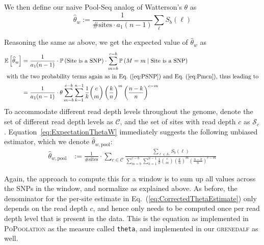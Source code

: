 \documentclass[letterpaper,fontsize=9pt,DIV=12]{scrartcl}
\newcommand\toolname{\textsc}
\newcommand\eqnref[1]{Eq.~(\ref{#1})}
\newcommand{\samplesize}{n}
\newcommand{\readdepth}{c}
\begin{document}
We then define our naive Pool-Seq analog of Watterson's $\theta$ as
\[
\widehat{\theta}_w :=\frac{1}{\text{\# sites} \cdot a_1(\samplesize-1)}\sum_{\ell} S_b(\ell)
\]

Reasoning the same as above, we get the expected value of $\widehat{\theta}_w$ as
%
\begin{align}
    \nonumber
    \mathbb{E}\left[\widehat{\theta}_w\right]
    &= \frac{1}{a_1(\samplesize-1)} \cdot \mathbb{P}\left(\text{Site is a SNP}\right)
        \cdot \sum_{m=b}^{\readdepth-b} \mathbb{P}\left(M = m \mid \text{Site is a SNP}\right)
    \\
    \intertext{
        with the two probability terms again as in \eqnref{eq:PSNP} and \eqnref{eq:Pmcn}, thus leading to
    }
    \label{eq:ExpectationThetaW}
    &= \frac{1}{a_1(n-1)} \cdot \theta\sum_{m=b}^{\readdepth-b}\sum_{k=1}^{n-1} \frac{1}{k} \binom{\readdepth}{m} \left(\frac{k}{\samplesize}\right)^m \left(\frac{\samplesize-k}{\samplesize}\right)^{\readdepth-m}
\end{align}
%
To accommodate different read depth levels throughout the genome, denote the set of different read depth levels as $\mathcal{C}$, and the set of sites with read depth $c$ as $\mathcal{S}_c$. Equation~\ref{eq:ExpectationThetaW} immediately suggests the following unbiased estimator, which we denote $\widehat{\theta}_{w, \text{pool}}$:
%
\begin{align}
    \label{eq:CorrectedThetaEstimate}
    \widehat{\theta}_{w, \text{pool}} &:= \frac{1}{\text{\# sites}} \cdot \sum_{c \in \mathcal{C}}
    \frac{
        \sum_{\ell \in \mathcal{S}_c} S_b(\ell)
    }{
         \sum_{m=b}^{\readdepth-b}\sum_{k=1}^{n-1} \frac{1}{k} \binom{\readdepth}{m} \left(\frac{k}{\samplesize}\right)^m \left(\frac{\samplesize-k}{\samplesize}\right)^{\readdepth-m}
    }
\end{align}

Again, the approach to compute this for a window is to sum up all values across the SNPs in the window, and normalize as explained above.  As before, the denominator for the per-site estimate in \eqnref{eq:CorrectedThetaEstimate} only depends on the read depth $\readdepth$, and hence only needs to be computed once per read depth level that is present in the data.  This is the equation as implemented in \toolname{PoPoolation} as the measure called \texttt{theta}, and implemented in our \toolname{grenedalf} as well.

\end{document}
